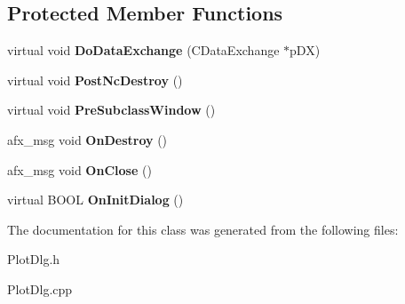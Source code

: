 \subsection*{Protected Member Functions}
\begin{DoxyCompactItemize}
\item 
\hypertarget{class_c_plot_dlg_ab72268856172223465728eaa91eeaa3f}{virtual void {\bfseries Do\-Data\-Exchange} (C\-Data\-Exchange $\ast$p\-D\-X)}\label{class_c_plot_dlg_ab72268856172223465728eaa91eeaa3f}

\item 
\hypertarget{class_c_plot_dlg_a44f6e9c8e5818779009d31f58dcb663d}{virtual void {\bfseries Post\-Nc\-Destroy} ()}\label{class_c_plot_dlg_a44f6e9c8e5818779009d31f58dcb663d}

\item 
\hypertarget{class_c_plot_dlg_ad998bf63a2f1ae64d106aa54e4a2d505}{virtual void {\bfseries Pre\-Subclass\-Window} ()}\label{class_c_plot_dlg_ad998bf63a2f1ae64d106aa54e4a2d505}

\item 
\hypertarget{class_c_plot_dlg_a9652fea574b656416e7810e37ecccc07}{afx\-\_\-msg void {\bfseries On\-Destroy} ()}\label{class_c_plot_dlg_a9652fea574b656416e7810e37ecccc07}

\item 
\hypertarget{class_c_plot_dlg_a59141cc96ca745eb9b4d946c4792e480}{afx\-\_\-msg void {\bfseries On\-Close} ()}\label{class_c_plot_dlg_a59141cc96ca745eb9b4d946c4792e480}

\item 
\hypertarget{class_c_plot_dlg_a698820cbddbebeb1d0671f9eaeb173c2}{virtual B\-O\-O\-L {\bfseries On\-Init\-Dialog} ()}\label{class_c_plot_dlg_a698820cbddbebeb1d0671f9eaeb173c2}

\end{DoxyCompactItemize}


The documentation for this class was generated from the following files\-:\begin{DoxyCompactItemize}
\item 
Plot\-Dlg.\-h\item 
Plot\-Dlg.\-cpp\end{DoxyCompactItemize}
